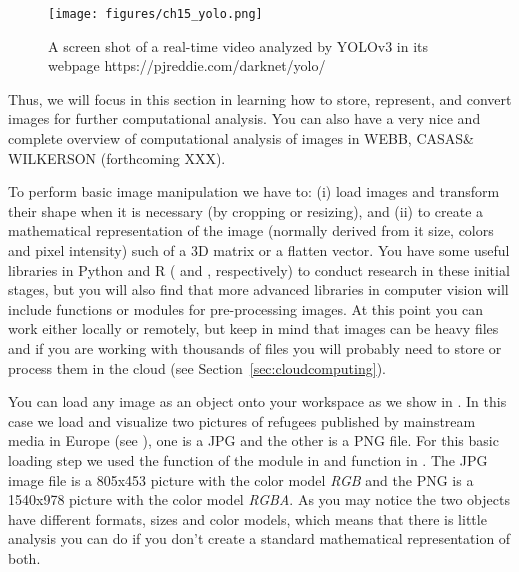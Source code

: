 \begin{figure}
\centering
\texttt{[image: figures/ch15\_yolo.png]}
\caption{A screen shot of a real-time video analyzed by YOLOv3 in its webpage https://pjreddie.com/darknet/yolo/}
\label{fig:yolo}
\end{figure}

Thus, we will focus in this section in learning how to store, represent, and convert images for further computational analysis. You can also have a very nice and complete overview of computational analysis of images in WEBB, CASAS\& WILKERSON (forthcoming XXX).

To perform basic image manipulation we have to: (i) load images and transform their shape when it is necessary (by cropping or resizing), and (ii) to create a mathematical representation of the image (normally derived from it size, colors and pixel intensity) such of a 3D matrix or a flatten vector. You have some useful libraries in Python and R ( and , respectively) to conduct research in these initial stages, but you will also find that more advanced libraries in computer vision will include functions or modules for pre-processing images. At this point you can work either locally or remotely, but keep in mind that images can be heavy files and if you are working with thousands of files you will probably need to store or process them in the cloud (see Section~\ref{sec:cloudcomputing}).

You can load any image as an object onto your workspace as we show in . In this case we load and visualize two pictures of refugees published by mainstream media in Europe (see \citet{amores2019visual}), one is a JPG and the other is a PNG file. For this basic loading step we used the  function of the  module in  and  function in . The JPG image file is a 805x453 picture with the color model \textit{RGB} and the PNG is a 1540x978 picture with the color model \textit{RGBA}. As you may notice the two objects have different formats, sizes and color models, which means that there is little analysis you can do if you don't create a standard mathematical representation of both. 


